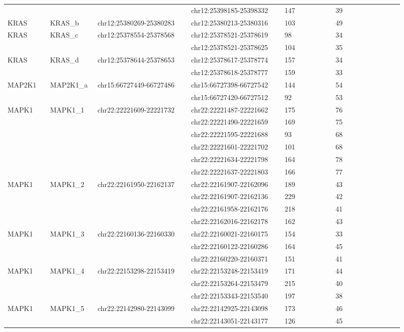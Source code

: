 \begin{landscape}
\begin{longtable}{p{0.1\linewidth}|p{0.1\linewidth}p{0.22\linewidth}p{0.22\linewidth}p{0.12\linewidth}p{0.16\linewidth}}
\\
 & & & chr12:25398185-25398332 & 147 & 39
\\
KRAS & KRAS\_b & chr12:25380269-25380283 & chr12:25380213-25380316 & 103 & 49
\\
KRAS & KRAS\_c & chr12:25378554-25378568 & chr12:25378521-25378619 & 98 & 34
\\
 & & & chr12:25378521-25378625 & 104 & 35
\\
KRAS & KRAS\_d & chr12:25378644-25378653 & chr12:25378617-25378774 & 157 & 34
\\
 & & & chr12:25378618-25378777 & 159 & 33
\\
\hline
MAP2K1 & MAP2K1\_a & chr15:66727449-66727486 & chr15:66727398-66727542 & 144 & 54
\\
 & & & chr15:66727420-66727512 & 92 & 53
\\
\hline
MAPK1 & MAPK1\_1 & chr22:22221609-22221732 & chr22:22221487-22221662 & 175 & 76
\\
 & & & chr22:22221490-22221659 & 169 & 75
\\
 & & & chr22:22221595-22221688 & 93 & 68
\\
 & & & chr22:22221601-22221702 & 101 & 68
\\
 & & & chr22:22221634-22221798 & 164 & 78
\\
 & & & chr22:22221637-22221803 & 166 & 77
\\
MAPK1 & MAPK1\_2 & chr22:22161950-22162137 & chr22:22161907-22162096 & 189 & 43
\\
 & & & chr22:22161907-22162136 & 229 & 42
\\
 & & & chr22:22161958-22162176 & 218 & 41
\\
 & & & chr22:22162016-22162178 & 162 & 43
\\
MAPK1 & MAPK1\_3 & chr22:22160136-22160330 & chr22:22160021-22160175 & 154 & 33
\\
 & & & chr22:22160122-22160286 & 164 & 45
\\
 & & & chr22:22160220-22160371 & 151 & 41
\\
MAPK1 & MAPK1\_4 & chr22:22153298-22153419 & chr22:22153248-22153419 & 171 & 44
\\
 & & & chr22:22153264-22153479 & 215 & 40
\\
 & & & chr22:22153343-22153540 & 197 & 38
\\
MAPK1 & MAPK1\_5 & chr22:22142980-22143099 & chr22:22142925-22143098 & 173 & 46
\\
 & & & chr22:22143051-22143177 & 126 & 45
\\

\end{longtable}
\end{landscape}
